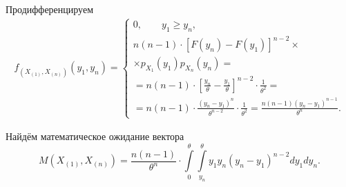\begin{enumerate}[label=\alph*)]
Продифференцируем
\begin{equation*}
  \begin{split}
    f_{ \left( X_{ \left( 1 \right) }, X_{ \left( n \right) } \right) } \left( y_1, y_n \right) =
    \begin{cases}
      0, \qquad y_1 \geq y_n, \\
      n \left( n - 1 \right) \cdot
      \left[ F \left( y_n \right) - F \left( y_1 \right) \right]^{n - 2} \times \\
      \times p_{X_1} \left( y_1 \right) p_{X_n} \left( y_n \right) = \\
      = n \left( n - 1 \right) \cdot
      \left[ \frac{y_n}{ \theta } - \frac{y_1}{ \theta } \right]^{n - 2} \cdot
      \frac{1}{ \theta^2} = \\
      = n \left( n - 1 \right) \cdot \frac{ \left( y_n - y_1 \right)^n}{ \theta^{n - 2}} \cdot
      \frac{1}{ \theta^2} =
      \frac{n \left( n - 1 \right) \left( y_n - y_1 \right)^{n - 1}}{ \theta^n}.
    \end{cases}
  \end{split}
\end{equation*}

Найдём математическое ожидание вектора
$$M \left( X_{ \left( 1 \right) }, X_{ \left( n \right) } \right) =
    \frac{n \left( n - 1 \right) }{ \theta^n} \cdot
    \int \limits_0^{ \theta }
      \int \limits_{y_n}^{ \theta } y_1 y_n \left( y_n - y_1 \right)^{n - 2} dy_1
    dy_n.$$


\end{enumerate}
